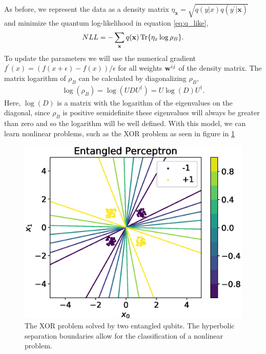 As before, we represent the data as a density matrix $\eta_\mathbf{x} = \sqrt{q(y|x)q(y^\prime|\mathbf{x})}$ and minimize the quantum log-likelihood in equation \ref{eq:q_like},
\begin{equation*}
    NLL = -\sum_{\mathbf{x}} q(\mathbf{x}) \Tr{\eta_x\log{\rho_B}}.
\end{equation*}
To update the parameters we will use the numerical gradient $f^\prime(x) = (f(x + \epsilon) - f(x)) / \epsilon$ for all weights $\mathbf{w}^{ij}$ of the density matrix. The matrix logarithm of $\rho_B$ can be calculated by diagonalizing $\rho_B$,
\begin{align*}
    \log(\rho_B) = \log(U D U^{\dagger}) = U\log(D) U^{\dagger}.
\end{align*}
Here, $\log(D)$ is a matrix with the logarithm of the eigenvalues on the diagonal, since $\rho_B$ is positive semidefinite these eigenvalues will always be greater than zero and so the logarithm will be well defined. With this model, we can learn nonlinear problems, such as the XOR problem as seen in figure in \ref{fig:entangled_XOR}
\begin{figure}[ht!]
\centering
    \includegraphics[width=1\linewidth]{figures/chapter3/entangled.eps}
    \caption{The XOR problem solved by two entangled qubits. The hyperbolic separation boundaries allow for the classification of a nonlinear problem.}
    \label{fig:entangled_XOR}
\end{figure}

